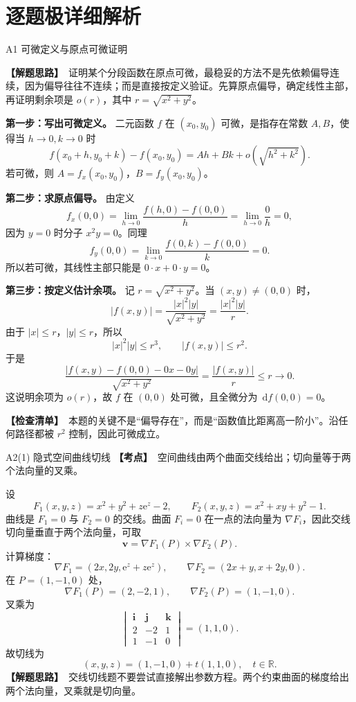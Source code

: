 \documentclass[UTF8,zihao=-4,openany]{ctexbook}
\newcommand{\R}{\mathbb{R}}
\newcommand{\dd}{\,\mathrm{d}}
\newcommand{\ee}{\mathrm{e}}
\newcommand{\grad}{\nabla}
\newcommand{\thinking}{\textcolor{mainblue}{\bfseries【解题思路】}}
\newcommand{\point}{\textcolor{warnred}{\bfseries【考点】}}
\newcommand{\checklist}{\textcolor{theogreen}{\bfseries【检查清单】}}
\begin{document}
\section*{逐题极详细解析}
\begin{solutionbox}{A1 可微定义与原点可微证明}

\thinking\ 证明某个分段函数在原点可微，最稳妥的方法不是先依赖偏导连续，因为偏导往往不连续；而是直接按定义验证。先算原点偏导，确定线性主部，再证明剩余项是 $o(r)$，其中 $r=\sqrt{x^2+y^2}$。

\textbf{第一步：写出可微定义。} 二元函数 $f$ 在 $(x_0,y_0)$ 可微，是指存在常数 $A,B$，使得当 $h\to0,k\to0$ 时
\[
f(x_0+h,y_0+k)-f(x_0,y_0)=Ah+Bk+o\left(\sqrt{h^2+k^2}\right).
\]
若可微，则 $A=f_x(x_0,y_0)$，$B=f_y(x_0,y_0)$。

\textbf{第二步：求原点偏导。} 由定义
\[
f_x(0,0)=\lim_{h\to0}\frac{f(h,0)-f(0,0)}{h}=\lim_{h\to0}\frac{0}{h}=0,
\]
因为 $y=0$ 时分子 $x^2y=0$。同理
\[
f_y(0,0)=\lim_{k\to0}\frac{f(0,k)-f(0,0)}{k}=0.
\]
所以若可微，其线性主部只能是 $0\cdot x+0\cdot y=0$。

\textbf{第三步：按定义估计余项。} 记 $r=\sqrt{x^2+y^2}$。当 $(x,y)\ne(0,0)$ 时，
\[
|f(x,y)|=\frac{|x|^2|y|}{\sqrt{x^2+y^2}}=\frac{|x|^2|y|}{r}.
\]
由于 $|x|\le r$，$|y|\le r$，所以
\[
|x|^2|y|\le r^3,
\qquad
|f(x,y)|\le r^2.
\]
于是
\[
\frac{|f(x,y)-f(0,0)-0x-0y|}{\sqrt{x^2+y^2}}
=\frac{|f(x,y)|}{r}\le r\to0.
\]
这说明余项为 $o(r)$，故 $f$ 在 $(0,0)$ 处可微，且全微分为 $\dd f(0,0)=0$。

\checklist\ 本题的关键不是“偏导存在”，而是“函数值比距离高一阶小”。沿任何路径都被 $r^2$ 控制，因此可微成立。
\end{solutionbox}

\begin{solutionbox}{A2(1) 隐式空间曲线切线}
\point\ 空间曲线由两个曲面交线给出；切向量等于两个法向量的叉乘。

设
\[
F_1(x,y,z)=x^2+y^2+z\ee^z-2,
\qquad
F_2(x,y,z)=x^2+xy+y^2-1.
\]
曲线是 $F_1=0$ 与 $F_2=0$ 的交线。曲面 $F_i=0$ 在一点的法向量为 $\grad F_i$，因此交线切向量垂直于两个法向量，可取
\[
\bm v=\grad F_1(P)\times \grad F_2(P).
\]
计算梯度：
\[
\grad F_1=(2x,2y,\ee^z+z\ee^z),
\qquad
\grad F_2=(2x+y,x+2y,0).
\]
在 $P=(1,-1,0)$ 处，
\[
\grad F_1(P)=(2,-2,1),
\qquad
\grad F_2(P)=(1,-1,0).
\]
叉乘为
\[
\begin{vmatrix}
\bm i&\bm j&\bm k\\
2&-2&1\\
1&-1&0
\end{vmatrix}
=(1,1,0).
\]
故切线为
\[
\boxed{(x,y,z)=(1,-1,0)+t(1,1,0),\quad t\in\R.}
\]
\thinking\ 交线切线题不要尝试直接解出参数方程。两个约束曲面的梯度给出两个法向量，叉乘就是切向量。
\end{solutionbox}
\end{document}
